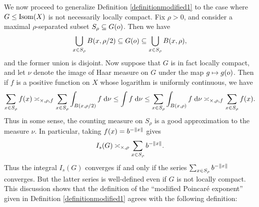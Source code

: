 We now proceed to generalize Definition \ref{definitionmodified1} to the case where $G\leq\operatorname{Isom}(X)$ is not necessarily locally compact. Fix $\rho > 0$, and consider a maximal $\rho$-separated subset $S_\rho\subseteq G(o)$. Then we have
\[
\bigcup_{x\in S_\rho} B(x,\rho/2) \subseteq G(o) \subseteq \bigcup_{x\in S_\rho} B(x,\rho),
\]
and the former union is disjoint. Now suppose that $G$ is in fact locally compact, and let $\nu$ denote the image of Haar measure on $G$ under the map $g\mapsto g(o)$. Then if $f$ is a positive function on $X$ whose logarithm is uniformly continuous, we have
\[
\sum_{x\in S_\rho} f(x)
\asymp_{\times,\rho,f} \sum_{x\in S_\rho} \int_{B(x,\rho/2)} f\;\mathrm{d}\nu
\leq \int f\;\mathrm{d}\nu
\leq \sum_{x\in S_\rho} \int_{B(x,\rho)} f\;\mathrm{d}\nu
\asymp_{\times,\rho,f} \sum_{x\in S_\rho} f(x).
\]
Thus in some sense, the counting measure on $S_\rho$ is a good approximation to the measure $\nu$. In particular, taking $f(x) = b^{-\|x\|}$ gives
\[
I_s(G) \asymp_{\times,\rho} \sum_{x\in S_\rho} b^{-\|x\|}.
\]
Thus the integral $I_s(G)$ converges if and only if the series $\sum_{x\in S_\rho} b^{-\|x\|}$ converges. But the latter series is well-defined even if $G$ is not locally compact. This discussion shows that the definition of the ``modified Poincar\'e exponent'' given in Definition \ref{definitionmodified1} agrees with the following definition:

